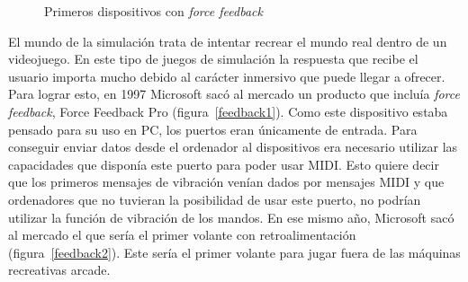 \begin{figure}[t]
     \hfill
{}
     \caption{Primeros dispositivos con \textit{force feedback}}
     \label{fig:feedback}
   \end{figure}

El mundo de la simulaci\'on trata de intentar recrear el mundo real dentro de un videojuego. En este tipo de juegos de simulaci\'on la respuesta que recibe el usuario importa mucho debido al car\'acter inmersivo que puede llegar a ofrecer. Para lograr esto, en 1997 Microsoft sac\'o al mercado un producto que inclu\'ia \textit{force feedback}, Force Feedback Pro (figura~\ref{feedback1}). Como este dispositivo estaba pensado para su uso en PC, los puertos eran \'unicamente de entrada. Para conseguir enviar datos desde el ordenador al dispositivos era necesario utilizar las capacidades que dispon\'ia este puerto para poder usar MIDI. Esto quiere decir que los primeros mensajes de vibraci\'on ven\'ian dados por mensajes MIDI y que ordenadores que no tuvieran la posibilidad de usar este puerto, no podr\'ian utilizar la funci\'on de vibraci\'on de los mandos. En ese mismo a\~no, Microsoft sac\'o al mercado el que ser\'ia el primer volante con retroalimentaci\'on (figura~\ref{feedback2}). Este ser\'ia el primer volante para jugar fuera de las m\'aquinas recreativas arcade.\\



